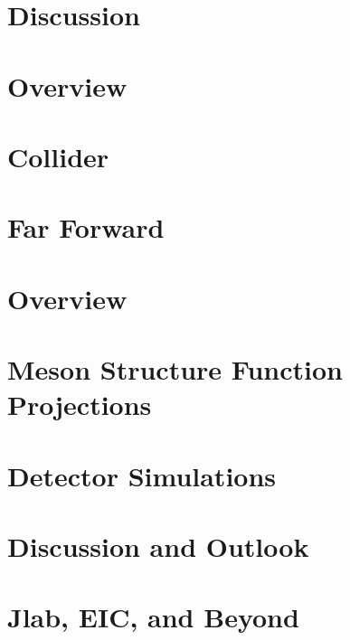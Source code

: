 \documentclass[
]{report}
\begin{document}
\hypertarget{Section-9.6}{%
\section{Discussion}\label{Section-9.6}}

\label{Chapter-10}

\hypertarget{Section-10.1}{%
\section{Overview}\label{Section-10.1}}

\hypertarget{Section-10.2}{%
\section{Collider}\label{Section-10.2}}

\hypertarget{Section-10.3}{%
\section{Far Forward}\label{Section-10.3}}

\label{Chapter-11}

\hypertarget{Section-11.1}{%
\section{Overview}\label{Section-11.1}}

\hypertarget{Section-11.2}{%
\section{Meson Structure Function Projections}\label{Section-11.2}}

\hypertarget{Section-11.3}{%
\section{Detector Simulations}\label{Section-11.3}}

\hypertarget{Section-11.4}{%
\section{Discussion and Outlook}\label{Section-11.4}}

\label{Chapter-12}

\hypertarget{Section-12.1}{%
\section{Jlab, EIC, and Beyond}\label{Section-12.1}}
\end{document}
